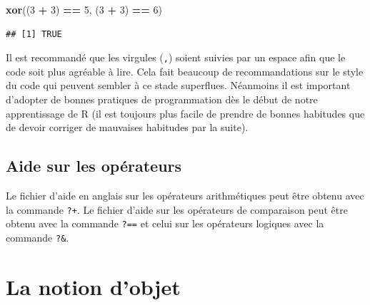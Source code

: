 \documentclass[
]{book}
\newenvironment{Shaded}{\begin{snugshade}}{\end{snugshade}}
\newcommand{\DecValTok}[1]{\textcolor[rgb]{0.00,0.00,0.81}{#1}}
\newcommand{\KeywordTok}[1]{\textcolor[rgb]{0.13,0.29,0.53}{\textbf{#1}}}
\newcommand{\NormalTok}[1]{#1}
\newcommand{\OperatorTok}[1]{\textcolor[rgb]{0.81,0.36,0.00}{\textbf{#1}}}
\newcommand{\StringTok}[1]{\textcolor[rgb]{0.31,0.60,0.02}{#1}}
\begin{document}
\begin{Shaded}
\begin{Highlighting}[]
\KeywordTok{xor}\NormalTok{((}\DecValTok{3} \OperatorTok{+}\StringTok{ }\DecValTok{3}\NormalTok{) }\OperatorTok{==}\StringTok{ }\DecValTok{5}\NormalTok{, (}\DecValTok{3} \OperatorTok{+}\StringTok{ }\DecValTok{3}\NormalTok{) }\OperatorTok{==}\StringTok{ }\DecValTok{6}\NormalTok{)}
\end{Highlighting}
\end{Shaded}

\begin{verbatim}
## [1] TRUE
\end{verbatim}

Il est recommandé que les virgules (\texttt{,}) soient suivies par un espace afin que le code soit plus agréable à lire. Cela fait beaucoup de recommandations sur le style du code qui peuvent sembler à ce stade superflues. Néanmoins il est important d'adopter de bonnes pratiques de programmation dès le début de notre apprentissage de R (il est toujours plus facile de prendre de bonnes habitudes que de devoir corriger de mauvaises habitudes par la suite).

\hypertarget{aide-sur-les-opuxe9rateurs}{%
\subsection{Aide sur les opérateurs}\label{aide-sur-les-opuxe9rateurs}}

Le fichier d'aide en anglais sur les opérateurs arithmétiques peut être obtenu avec la commande \texttt{?\textquotesingle{}+\textquotesingle{}}. Le fichier d'aide sur les opérateurs de comparaison peut être obtenu avec la commande \texttt{?\textquotesingle{}==\textquotesingle{}} et celui sur les opérateurs logiques avec la commande \texttt{?\textquotesingle{}\&\textquotesingle{}}.

\hypertarget{l011object}{%
\section{La notion d'objet}\label{l011object}}
\end{document}
